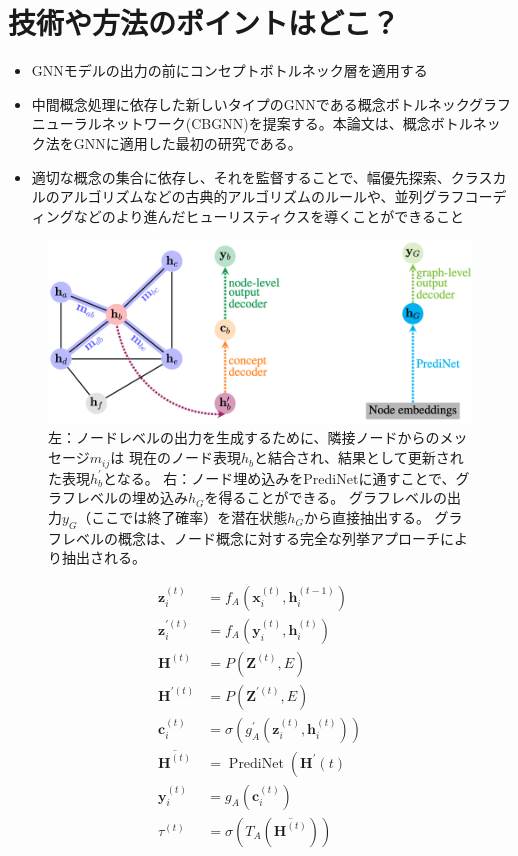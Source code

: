 \documentclass[a4paper,10pt]{ltjsarticle}
\newcommand{\1}{\mbox{1}\hspace{-0.25em}\mbox{l}}
\theoremstyle{definition}
\begin{document}
    \section{技術や方法のポイントはどこ？}
    \begin{itemize}
        \item GNNモデルの出力の前にコンセプトボトルネック層を適用する
        \item 中間概念処理に依存した新しいタイプのGNNである概念ボトルネックグラフニューラルネットワーク(CBGNN)を提案する。本論文は、概念ボトルネック法をGNNに適用した最初の研究である。
        \item 適切な概念の集合に依存し、それを監督することで、幅優先探索、クラスカルのアルゴリズムなどの古典的アルゴリズムのルールや、並列グラフコーディングなどのより進んだヒューリスティクスを導くことができること
    \end{itemize}
    \begin{figure}[H]
        \centering
        \includegraphics[width=120mm]{fig/cbgnn_2}
        \caption{左：ノードレベルの出力を生成するために、隣接ノードからのメッセージ$m_{ij}$は
        現在のノード表現$h_b$と結合され、結果として更新された表現$h^\prime_b$となる。
        右：ノード埋め込みをPrediNetに通すことで、グラフレベルの埋め込み$h_G$を得ることができる。
        グラフレベルの出力$y_G$（ここでは終了確率）を潜在状態$h_G$から直接抽出する。
        グラフレベルの概念は、ノード概念に対する完全な列挙アプローチにより抽出される。}
    \end{figure}
    \begin{equation}
        \begin{aligned}
            \mathbf{z}_{i}^{(t)} &=f_{A}\left(\mathbf{x}_{i}^{(t)}, \mathbf{h}_{i}^{(t-1)}\right) \\
            \mathbf{z}_{i}^{\prime(t)} &=f_{A}\left(\mathbf{y}_{i}^{(t)}, \mathbf{h}_{i}^{(t)}\right) \\
            \mathbf{H}^{(t)} &=P\left(\mathbf{Z}^{(t)}, E\right) \\
            \mathbf{H}^{\prime(t)} &=P\left(\mathbf{Z}^{\prime(t)}, E\right) \\
            \mathbf{c}_{i}^{(t)} &=\sigma\left(g_{A}^{\prime}\left(\mathbf{z}_{i}^{(t)}, \mathbf{h}_{i}^{(t)}\right)\right) \\
            \overline{\mathbf{H}^{(t)}} &=\operatorname{PrediNet}\left(\mathbf{H}^{\prime}(t)\right.\\
            \mathbf{y}_{i}^{(t)} &=g_{A}\left(\mathbf{c}_{i}^{(t)}\right) \\
            \tau^{(t)} &=\sigma\left(T_{A}\left(\overline{\mathbf{H}^{(t)}}\right)\right)
        \end{aligned}
    \end{equation}
\end{document}
